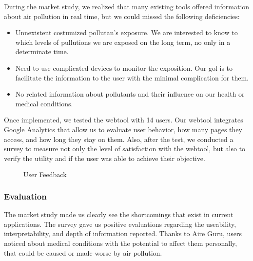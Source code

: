 During the market study, we realized that many existing tools offered information about air pollution in real time, but we could missed the following deficiencies:
\begin{itemize}
    \item Unnexistent costumized pollutan's exposure. We are interested to know to which levels of pullutions we are exposed on the long term, no only in a determinate time.
    \item Need to use complicated devices to monitor the exposition. Our gol is to facilitate the information to the user with the minimal complication for them.
    \item No related information about pollutants and their influence on our health or medical conditions.
\end{itemize}

Once implemented, we tested the webtool with 14 users. Our webtool integrates Google Analytics that allow us to evaluate
user behavior, how many pages they access, and how long they stay on them. Also, after the test, we conducted a survey to measure not only the level of satisfaction with the webtool, but also to verify the utility and if the user was able to achieve their objective.
\begin{figure}[ht]
    \centering
    \hfill
  
  \caption{User Feedback}
    \end{figure}
 
\subsubsection*{Evaluation}

\begin{itemize}
    \done The market study made us clearly see the shortcomings that exist in current applications.
    \done The survey gave us positive evaluations regarding the useability, interpretability, and depth of information reported.
    \done Thanks to Aire Guru, users noticed about medical conditions with the potential to affect them personally, that could be caused or made worse by air pollution.
\end{itemize}